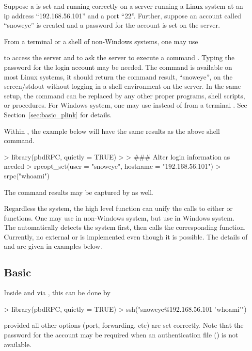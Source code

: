 Suppose a  is set and running correctly on a server running a Linux
system at an ip address ``192.168.56.101'' and a port ``22''.
Further, suppose an account
called ``snoweye'' is created and a password for the account is set on
the server.

From a terminal or a shell of non-Windows systems, one may use
to access the server and to ask the server to execute a command .
Typing the password for the login account may be needed.
The command  is available on most Linux systems, it should
return the command result, ``snoweye'', on the screen/stdout without
logging in a shell environment on the server.
In the same setup, the command  can be replaced
by any other proper programs, shell scripts, or procedures.
For Windows system, one may use  instead of 
from a terminal . See Section~\ref{sec:basic_plink} for details.

Within , the example below will have the
same results as the above shell command.
\begin{Code}[title=Basic \code{srpc()} in \pkg{pbdRPC} and \proglang{R}]
> library(pbdRPC, quietly = TRUE)
>
> ### Alter login information as needed
> rpcopt_set(user = "snoweye", hostname = "192.168.56.101")
> srpc("whoami")
\end{Code}
The command results may be captured by  as well.

Regardless the system,
the high level function  can unify the calls to
either  or  functions.
One may use  in non-Windows system, but
use  in Windows system.
The  automatically
detects the system first, then calls the corresponding function.
Currently, no external  or  is implemented
even though it is possible.
The details of  and  are given in examples below.


\subsection[Basic \code{ssh()}]{Basic }
\label{sec:basic_ssh}

Inside  and via , this can be done by
\begin{Code}[title=Basic \code{ssh()} in \pkg{pbdRPC} and \proglang{R}]
> library(pbdRPC, quietly = TRUE)
> ssh("snoweye@192.168.56.101 'whoami'")
\end{Code}
provided all other options (port, forwarding, etc) are set correctly.
Note that the password for the account may be required when an
authentication file () is not available.

